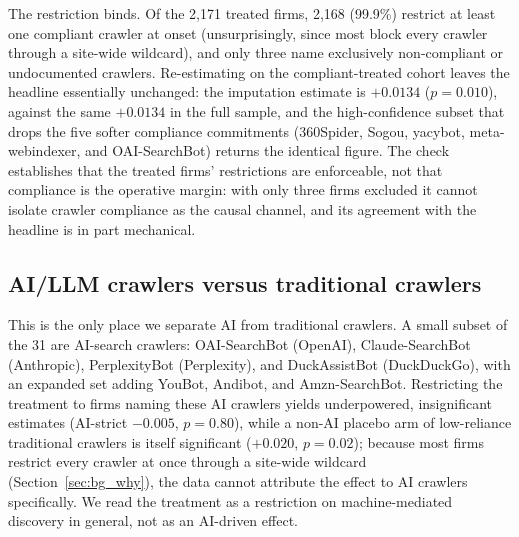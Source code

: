 \documentclass[12pt]{article}
\begin{document}
The restriction binds. Of the 2{,}171 treated firms, 2{,}168 (99.9\%) restrict at least one compliant crawler at onset (unsurprisingly, since most block every crawler through a site-wide wildcard), and only three name exclusively non-compliant or undocumented crawlers. Re-estimating on the compliant-treated cohort leaves the headline essentially unchanged: the imputation estimate is $+0.0134$ ($p=0.010$), against the same $+0.0134$ in the full sample, and the high-confidence subset that drops the five softer compliance commitments (360Spider, Sogou, yacybot, meta-webindexer, and OAI-SearchBot) returns the identical figure. The check establishes that the treated firms' restrictions are enforceable, not that compliance is the operative margin: with only three firms excluded it cannot isolate crawler compliance as the causal channel, and its agreement with the headline is in part mechanical.

\subsection{AI/LLM crawlers versus traditional crawlers}\label{app:aiplacebo}
This is the only place we separate AI from traditional crawlers. A small subset of the 31 are AI-search crawlers: OAI-SearchBot (OpenAI), Claude-SearchBot (Anthropic), PerplexityBot (Perplexity), and DuckAssistBot (DuckDuckGo), with an expanded set adding YouBot, Andibot, and Amzn-SearchBot. Restricting the treatment to firms naming these AI crawlers yields underpowered, insignificant estimates (AI-strict $-0.005$, $p=0.80$), while a non-AI placebo arm of low-reliance traditional crawlers is itself significant ($+0.020$, $p=0.02$); because most firms restrict every crawler at once through a site-wide wildcard (Section~\ref{sec:bg_why}), the data cannot attribute the effect to AI crawlers specifically. We read the treatment as a restriction on machine-mediated discovery in general, not as an AI-driven effect.
\end{document}
